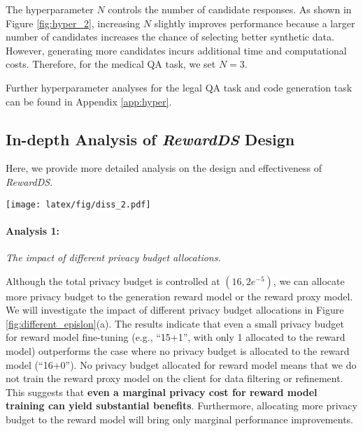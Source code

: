 The hyperparameter $N$ controls the number of candidate responses. 
As shown in Figure \ref{fig:hyper_2}, increasing $N$ slightly improves performance because a larger number of candidates increases the chance of selecting better synthetic data. 
However, generating more candidates incurs additional time and computational costs. 
Therefore, for the medical QA task, we set $N = 3$.

Further hyperparameter analyses for the legal QA task and code generation task can be found in Appendix \ref{app:hyper}.


\subsection{In-depth Analysis of \textit{RewardDS} Design}
Here, we provide more detailed analysis on the design and effectiveness of \textit{RewardDS}. 
\begin{figure*}[!htbp]

  \texttt{[image: latex/fig/diss\_2.pdf]}
    \label{fig:grow_legend}
  \vspace{-0.7em}
  \caption{
  Effectiveness of \textit{RewardDS} design.
  (a): Performance on medical QA with different privacy budget allocations for generation and reward proxy model training.
  The allocation of `x + (16-x)' means the privacy budget for training the generation proxy model is set to x, while the reward proxy model is set to (16-x);
  (b)/(c)/(d): Quality improvement of the synthetic data, on the Medical QA/Financial QA/Code Generation tasks, after applying the Self-Optimizing Refinement module multiple times.
  }
  \vspace{-1.0em}
  \label{fig:different_epislon}
\end{figure*}


\paragraph{Analysis 1:}\textit{The impact of different privacy budget allocations.}

Although the total privacy budget is controlled at $(16, 2e^{-5})$, we can allocate more privacy budget to the generation reward model or the reward proxy model.
We will investigate the impact of different privacy budget allocations in Figure \ref{fig:different_epislon}(a). 
The results indicate that even a small privacy budget for reward model fine-tuning (e.g., ``15+1'', with only 1 allocated to the reward model) outperforms the case where no privacy budget is allocated to the reward model (``16+0''). 
No privacy budget allocated for reward model means that we do not train the reward proxy model on the client for data filtering or refinement.
This suggests that \textbf{even a marginal privacy cost for reward model training can yield substantial benefits}. 
Furthermore, allocating more privacy budget to the reward model will bring only marginal performance improvements.


